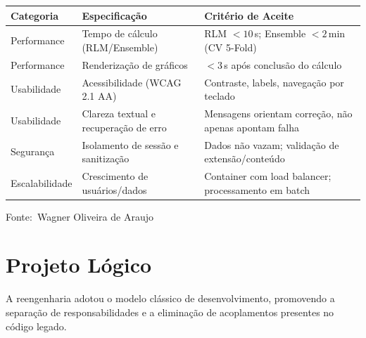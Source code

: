 \documentclass[12pt,a4paper]{article}
\newcommand{\oautor}{Wagner Oliveira de Araujo}
\begin{document}
\begin{quadro}[ht]
\begin{center}
\small
\caption{Especificação de requisitos não funcionais}
\label{quadro:nao-funcionais}
\begin{threeparttable}
\begin{tabularx}{\textwidth}{|l|X|X|} \hline
\textbf{Categoria} & \textbf{Especificação} & \textbf{Critério de Aceite} \\ \hline
Performance & Tempo de cálculo (RLM/Ensemble) & RLM $< 10\,$s; Ensemble $< 2\,$min (CV 5-Fold) \\ \hline
Performance & Renderização de gráficos & $< 3\,$s após conclusão do cálculo \\ \hline
Usabilidade & Acessibilidade (WCAG 2.1 AA) & Contraste, labels, navegação por teclado \\ \hline
Usabilidade & Clareza textual e recuperação de erro & Mensagens orientam correção, não apenas apontam falha \\ \hline
Segurança & Isolamento de sessão e sanitização & Dados não vazam; validação de extensão/conteúdo \\ \hline
Escalabilidade & Crescimento de usuários/dados & Container com load balancer; processamento em batch \\ \hline
\end{tabularx}
\begin{tablenotes}[flushleft]
\footnotesize
\item Fonte:~\oautor
\end{tablenotes}
\end{threeparttable}
\end{center}
\end{quadro}

\section{Projeto Lógico}

A reengenharia adotou o modelo clássico de desenvolvimento, promovendo a separação de responsabilidades e a eliminação de acoplamentos presentes no código legado.
\end{document}

